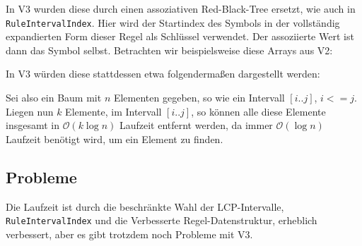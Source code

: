 In V3 wurden diese durch einen assoziativen Red-Black-Tree ersetzt, wie auch in \texttt{RuleIntervalIndex}. Hier wird der Startindex des Symbols in der vollständig expandierten Form dieser Regel als Schlüssel verwendet. Der assoziierte Wert ist dann das Symbol selbst. Betrachten wir beispielsweise diese Arrays aus V2:

\begin{figure}[H]
	\centering
	\quad
\end{figure}

In V3 würden diese stattdessen etwa folgendermaßen dargestellt werden:

\begin{figure}[H]
	\centering
\end{figure}

Sei also ein Baum mit $n$ Elementen gegeben, so wie ein Intervall $[i..j]$, $i <= j$. Liegen nun $k$ Elemente, im Intervall $[i..j]$, so können alle diese Elemente insgesamt in $\mathcal{O}(k \log n)$ Laufzeit entfernt werden, da immer $\mathcal{O}(\log n)$ Laufzeit benötigt wird, um ein Element zu finden.

\subsection{Probleme}


Die Laufzeit ist durch die beschränkte Wahl der LCP-Intervalle, \texttt{RuleIntervalIndex} und die Verbesserte Regel-Datenstruktur, erheblich verbessert, aber es gibt trotzdem noch Probleme mit V3.

